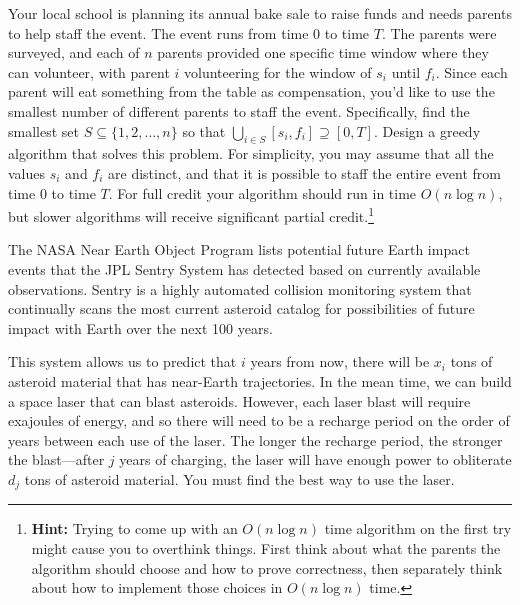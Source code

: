 \documentclass[11pt]{article}
\theoremstyle{definition}
\begin{document}
\begin{enumerate}[leftmargin=0pt, itemsep=3ex]
\problemitem Your local school is planning its annual bake sale to raise funds and needs parents to help staff the event.  The event runs from time $0$ to time $T$.  The parents were surveyed, and each of $n$ parents provided one specific time window where they can volunteer, with parent $i$ volunteering for the window of $s_i$ until $f_i$.  Since each parent will eat something from the table as compensation, you'd like to use the smallest number of different parents to staff the event.  Specifically, find the smallest set $S \subseteq \{1,2,\dots,n\}$ so that
$
\bigcup_{i \in S} [s_i, f_i] \supseteq [0,T].
$
Design a greedy algorithm that solves this problem.  For simplicity, you may assume that all the values $s_i$ and $f_i$ are distinct, and that it is possible to staff the entire event from time $0$ to time $T$.  For full credit your algorithm should run in time $O(n \log n)$, but slower algorithms will receive significant partial credit.\footnote{\textbf{Hint:} Trying to come up with an $O(n \log n)$ time algorithm on the first try might cause you to overthink things.  First think about what the parents the algorithm should choose and how to prove correctness, then separately think about how to implement those choices in $O(n \log n)$ time.}


\problemitem The NASA Near Earth Object Program  lists potential future Earth impact events that the JPL Sentry System has detected based on currently available observations.   Sentry is a highly automated collision monitoring system that continually scans the most current asteroid catalog for possibilities of future impact with Earth over the next 100 years. 

This system allows us to predict that $i$ years from now, there will be $x_i$ tons of asteroid material that has near-Earth trajectories.  In the mean time, we can build a space laser that can blast asteroids.  However,  each laser blast will require exajoules of energy, and so there will need to be a recharge period on the order of years between each use of the laser.  The longer the recharge period, the stronger the blast---after $j$ years of charging, the laser will have enough power to obliterate $d_j$ tons of asteroid material.  You must find the best way to use the laser.


\end{enumerate}
\end{document}
